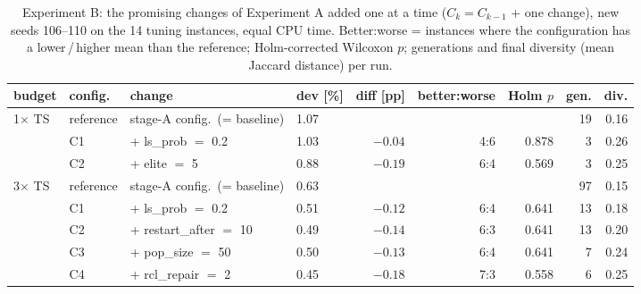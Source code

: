 \begin{table}[t]
\centering\footnotesize
\setlength{\tabcolsep}{4pt}
\caption{Experiment B: the promising changes of Experiment A added one at a time ($C_k = C_{k-1}$ + one change), new seeds 106--110 on the 14 tuning instances, equal CPU time. Better:worse = instances where the configuration has a lower\,/\,higher mean than the reference; Holm-corrected Wilcoxon $p$; generations and final diversity (mean Jaccard distance) per run.}
\label{tab:stageB}
\begin{tabular}{llllrrrrr}
\toprule
budget & config. & change & dev [\%] & diff [pp] & better:worse & Holm $p$ & gen. & div. \\
\midrule
\multirow{3}{*}{1$\times$ TS} & reference & stage-A config.\ (= baseline) & 1.07 &  &  &  & 19 & 0.16 \\
 & C1 & + ls\_prob $=$ 0.2 & 1.03 & $-0.04$ & 4:6 & 0.878 & 3 & 0.26 \\
 & C2 & + elite $=$ 5 & 0.88 & $-0.19$ & 6:4 & 0.569 & 3 & 0.25 \\
\midrule
\multirow{5}{*}{3$\times$ TS} & reference & stage-A config.\ (= baseline) & 0.63 &  &  &  & 97 & 0.15 \\
 & C1 & + ls\_prob $=$ 0.2 & 0.51 & $-0.12$ & 6:4 & 0.641 & 13 & 0.18 \\
 & C2 & + restart\_after $=$ 10 & 0.49 & $-0.14$ & 6:3 & 0.641 & 13 & 0.20 \\
 & C3 & + pop\_size $=$ 50 & 0.50 & $-0.13$ & 6:4 & 0.641 & 7 & 0.24 \\
 & C4 & + rcl\_repair $=$ 2 & 0.45 & $-0.18$ & 7:3 & 0.558 & 6 & 0.25 \\
\bottomrule
\end{tabular}
\end{table}
